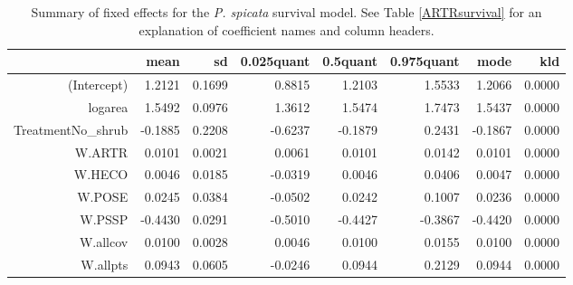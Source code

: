 \documentclass[11pt]{article}
\begin{document}
\begin{table}[ht]
\centering
\caption{Summary of fixed effects for the \textit{P. spicata} survival model. See Table \ref{ARTRsurvival} for an explanation of coefficient names
and column headers.} 
\label{PSSPsurvival}
\begin{tabular}{rrrrrrrr}
  \hline
 & mean & sd & 0.025quant & 0.5quant & 0.975quant & mode & kld \\ 
  \hline
(Intercept) & 1.2121 & 0.1699 & 0.8815 & 1.2103 & 1.5533 & 1.2066 & 0.0000 \\ 
  logarea & 1.5492 & 0.0976 & 1.3612 & 1.5474 & 1.7473 & 1.5437 & 0.0000 \\ 
  TreatmentNo\_shrub & -0.1885 & 0.2208 & -0.6237 & -0.1879 & 0.2431 & -0.1867 & 0.0000 \\ 
  W.ARTR & 0.0101 & 0.0021 & 0.0061 & 0.0101 & 0.0142 & 0.0101 & 0.0000 \\ 
  W.HECO & 0.0046 & 0.0185 & -0.0319 & 0.0046 & 0.0406 & 0.0047 & 0.0000 \\ 
  W.POSE & 0.0245 & 0.0384 & -0.0502 & 0.0242 & 0.1007 & 0.0236 & 0.0000 \\ 
  W.PSSP & -0.4430 & 0.0291 & -0.5010 & -0.4427 & -0.3867 & -0.4420 & 0.0000 \\ 
  W.allcov & 0.0100 & 0.0028 & 0.0046 & 0.0100 & 0.0155 & 0.0100 & 0.0000 \\ 
  W.allpts & 0.0943 & 0.0605 & -0.0246 & 0.0944 & 0.2129 & 0.0944 & 0.0000 \\ 
   \hline
\end{tabular}
\end{table}
\end{document}
